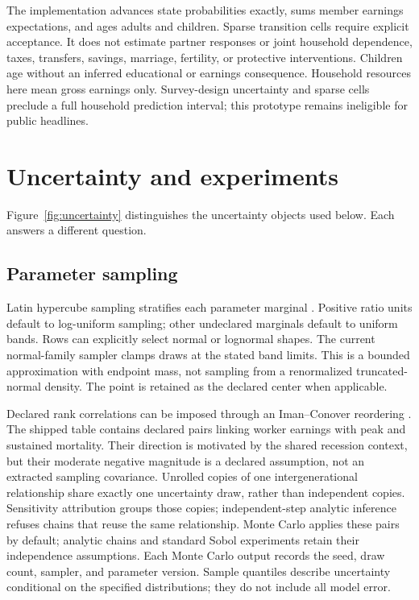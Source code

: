 \documentclass[10pt]{article}
\begin{document}
The implementation advances state probabilities exactly, sums member
earnings expectations, and ages adults and children. Sparse transition
cells require explicit acceptance. It does not estimate partner responses
or joint household dependence, taxes, transfers, savings, marriage,
fertility, or protective interventions. Children age without an inferred
educational or earnings consequence. Household resources here mean gross
earnings only. Survey-design uncertainty and sparse cells preclude a full
household prediction interval; this prototype remains ineligible for
public headlines.

\section{Uncertainty and experiments}
Figure~\ref{fig:uncertainty} distinguishes the uncertainty objects used
below. Each answers a different question.


\subsection{Parameter sampling}
Latin hypercube sampling stratifies each parameter marginal
\cite{mckay1979}. Positive ratio units default to log-uniform sampling;
other undeclared marginals default to uniform bands. Rows can explicitly
select normal or lognormal shapes. The current normal-family sampler
clamps draws at the stated band limits. This is a bounded approximation
with endpoint mass, not sampling from a renormalized truncated-normal
density. The point is retained as the declared center when applicable.

Declared rank correlations can be imposed through an Iman--Conover
reordering \cite{iman1982}. The shipped table contains \CorrelationCount{} declared pairs linking
worker earnings with peak and sustained mortality. Their direction is
motivated by the shared recession context, but their moderate negative
magnitude is a declared assumption, not an extracted sampling covariance.
Unrolled copies of one intergenerational relationship share exactly one uncertainty draw, rather than independent copies. Sensitivity attribution groups those copies; independent-step analytic inference refuses chains that reuse the same relationship. Monte Carlo applies these pairs by default; analytic chains and standard
Sobol experiments retain their independence assumptions. Each Monte Carlo output records the seed, draw count, sampler,
and parameter version. Sample quantiles describe uncertainty conditional
on the specified distributions; they do not include all model error.
\end{document}
